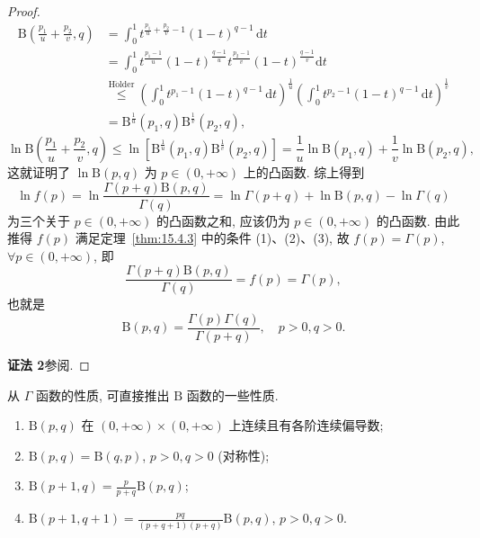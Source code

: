 \begin{proof}
\[
  \begin{aligned}
    \mathrm{B}\left(\frac{p_{1}}{u}+\frac{p_{2}}{v},q\right)&=\int_{0}^{1}t^{\frac{p_{1}}{u}+\frac{p_{2}}{v}-1}(1-t)^{q-1}\,\mathrm{d}t\\
    &=\int_{0}^{1}t^{\frac{p_{1}-1}{u}}(1-t)^{\frac{q-1}{u}}t^{\frac{p_{2}-1}{v}}(1-t)^{\frac{q-1}{v}}\mathrm{d}t\\
    &\stackrel{\mathrm{H\ddot{o}lder}}{\leqslant}\left(\int_{0}^{1}t^{p_{1}-1}(1-t)^{q-1}\,\mathrm{d}t\right)^{\frac{1}{u}}\left(\int_{0}^{1}t^{p_{2}-1}(1-t)^{q-1}\,\mathrm{d}t\right)^{\frac{1}{v}}\\
    &=\mathrm{B}^{\frac{1}{u}}(p_{1},q)\mathrm{B}^{\frac{1}{v}}(p_{2},q),
  \end{aligned}
\]
\[
  \ln\mathrm{B}\left(\frac{p_{1}}{u}+\frac{p_{2}}{v},q\right)\leqslant\ln\left[\mathrm{B}^{\frac{1}{u}}(p_{1},q)\mathrm{B}^{\frac{1}{v}}(p_{2},q)\right]=\frac{1}{u}\ln\mathrm{B}(p_{1},q)+\frac{1}{v}\ln\mathrm{B}(p_{2},q),
\]
这就证明了 $\ln\mathrm{B}(p,q)$ 为 $p\in(0,+\infty)$ 上的凸函数. 综上得到
\[
  \ln f(p)=\ln\frac{\Gamma(p+q)\mathrm{B}(p,q)}{\Gamma(q)}=\ln\Gamma(p+q)+\ln\mathrm{B}(p,q)-\ln\Gamma(q)
\]
为三个关于 $p\in(0,+\infty)$ 的凸函数之和, 应该仍为 $p\in(0,+\infty)$ 的凸函数. 由此推得 $f(p)$ 满足定理~\ref{thm:15.4.3} 中的条件 (1)、(2)、(3), 故 $f(p)=\Gamma(p)$, $\forall p\in(0,+\infty)$, 即
\[
  \frac{\Gamma(p+q)\mathrm{B}(p,q)}{\Gamma(q)}=f(p)=\Gamma(p),
\]
也就是
\[
  \mathrm{B}(p,q)=\frac{\Gamma(p)\Gamma(q)}{\Gamma(p+q)},\quad p>0,q>0.
\]

\textbf{证法 2}\quad 参阅.
\end{proof}

从 $\Gamma$ 函数的性质, 可直接推出 $\mathrm{B}$ 函数的一些性质.

\begin{theorem}\label{thm:15.4.6}
\begin{enumerate}
  \item $\mathrm{B}(p,q)$ 在 $(0,+\infty)\times(0,+\infty)$ 上连续且有各阶连续偏导数;
  \item $\mathrm{B}(p,q)=\mathrm{B}(q,p)$, $p>0, q>0$ (对称性);
  \item $\displaystyle\mathrm{B}(p+1,q)=\frac{p}{p+q}\mathrm{B}(p,q)$;
  \item $\displaystyle\mathrm{B}(p+1,q+1)=\frac{pq}{(p+q+1)(p+q)}\mathrm{B}(p,q)$, $p>0, q>0$.
\end{enumerate}
\end{theorem}

